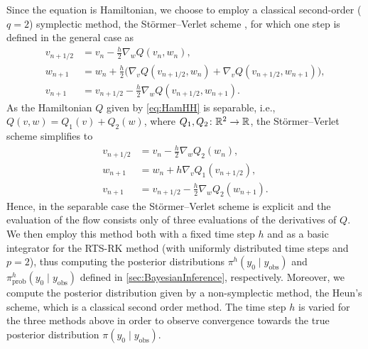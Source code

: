 \documentclass[10pt]{article}
\begin{document}
Since the equation is Hamiltonian, we choose to employ a classical second-order ($q = 2$) symplectic method, the Störmer--Verlet scheme \cite{Sto07, Ver67, HLW06}, for which one step is defined in the general case as
\begin{equation}
\begin{aligned}
v_{n+1/2} &= v_n - \frac{h}{2} \nabla_w Q(v_n, w_n), \\
w_{n+1} &= w_n + \frac{h}{2} \big(\nabla_v Q(v_{n+1/2}, w_n) + \nabla_v Q(v_{n+1/2}, w_{n+1})\big),\\
v_{n+1} &= v_{n+1/2} - \frac{h}{2} \nabla_w Q(v_{n+1/2}, w_{n+1}).
\end{aligned}
\end{equation}
As the Hamiltonian $Q$ given by \eqref{eq:HamHH} is separable, i.e., $Q(v, w) = Q_1(v) + Q_2(w)$, where $Q_1, Q_2 \colon \mathbb{R}^2 \to \mathbb{R}$, the Störmer--Verlet scheme simplifies to
\begin{equation}
\begin{aligned}
v_{n+1/2} &= v_n - \frac{h}{2} \nabla_w Q_2(w_n), \\
w_{n+1} &= w_n + h \nabla_v Q_1(v_{n+1/2}),\\
v_{n+1} &= v_{n+1/2} - \frac{h}{2} \nabla_w Q_2(w_{n+1}).
\end{aligned}
\end{equation}
Hence, in the separable case the Störmer--Verlet scheme is explicit and the evaluation of the flow consists only of three evaluations of the derivatives of $Q$. We then employ this method both with a fixed time step $h$ and as a basic integrator for the RTS-RK method (with uniformly distributed time steps and $p = 2$), thus computing the posterior distributions $\pi^h(y_0 \mid y_{\mathrm{obs}})$ and $\pi^h_{\mathrm{prob}}(y_0 \mid y_{\mathrm{obs}})$ defined in \cref{sec:BayesianInference}, respectively. Moreover, we compute the posterior distribution given by a non-symplectic method, the Heun's scheme, which is a classical second order method. The time step $h$ is varied for the three methods above in order to observe convergence towards the true posterior distribution $\pi(y_0 \mid y_{\mathrm{obs}})$.
\end{document}
